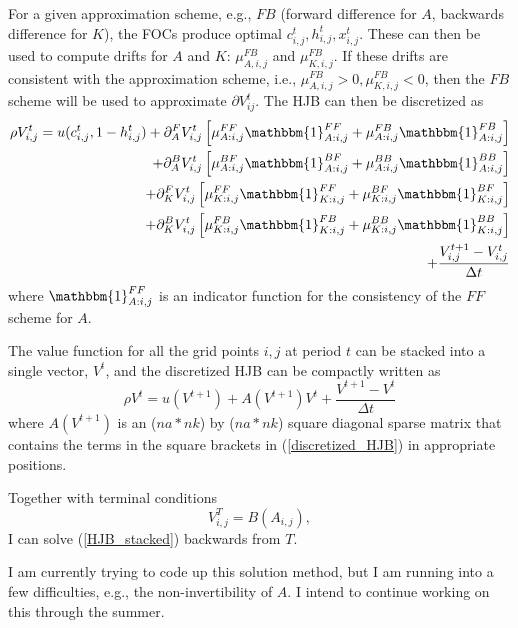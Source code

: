 \documentclass[12pt]{article}
\begin{document}
For a given approximation scheme, e.g., $FB$ (forward difference for $A$, backwards difference for $K$), the FOCs produce optimal $c_{i,j}^t, h_{i,j}^t, x_{i,j}^t$.
These can then be used to compute drifts for $A$ and $K$: $\mu_{A, i,j}^{FB}$ and $\mu_{K, i,j}^{FB}$.
If these drifts are consistent with the approximation scheme, i.e., $\mu_{A, i,j}^{FB} > 0, \mu_{K, i,j}^{FB} < 0$, then the $FB$ scheme will be used to approximate $\partial V_{ij}^t$.
The HJB can then be discretized as
\begin{align}
    \rho V_{i,j}^t = u(c_{i,j}^t, 1-h_{i,j}^t) + \partial_A^F V_{i,j}^t \left[ \mu_{A: i, j}^{FF} \mathbbm{1}_{A: i, j}^{FF} + \mu_{A: i, j}^{FB} \mathbbm{1}_{A: i, j}^{FB} \right] \label{discretized_HJB} \\
    + \partial_A^B V_{i,j}^t \left[ \mu_{A: i, j}^{BF} \mathbbm{1}_{A: i, j}^{BF} + \mu_{A: i, j}^{BB} \mathbbm{1}_{A: i, j}^{BB} \right] \nonumber \\
    + \partial_K^F V_{i,j}^t \left[ \mu_{K: i, j}^{FF} \mathbbm{1}_{K: i, j}^{FF} + \mu_{K: i, j}^{BF} \mathbbm{1}_{K: i, j}^{BF} \right] \nonumber\\
    + \partial_K^B V_{i,j}^t \left[ \mu_{K: i, j}^{FB} \mathbbm{1}_{K: i, j}^{FB} + \mu_{K: i, j}^{BB} \mathbbm{1}_{K: i, j}^{BB} \right] \nonumber \\
    + \frac{V_{i,j}^{t+1} - V_{i,j}^{t}}{\Delta t} \nonumber
\end{align}
where $\mathbbm{1}_{A:i,j}^{FF}$ is an indicator function for the consistency of the $FF$ scheme for $A$.

The value function for all the grid points $i, j$ at period $t$ can be stacked into a single vector, $V^t$, and the discretized HJB can be compactly written as
\begin{equation}
    \rho V^t = u(V^{t+1}) + A(V^{t+1}) V^t + \frac{V^{t+1} - V^t}{\Delta t} \label{HJB_stacked}
\end{equation}
where $A(V^{t+1})$ is an ($na*nk$) by ($na*nk$) square diagonal sparse matrix that contains the terms in the square brackets in (\ref{discretized_HJB}) in appropriate positions.

Together with terminal conditions
\begin{equation}
    V^T_{i,j} = B(A_{i,j}),
\end{equation}
I can solve (\ref{HJB_stacked}) backwards from $T$.

I am currently trying to code up this solution method, but I am running into a few difficulties, e.g., the non-invertibility of $A$. I intend to continue working on this through the summer.

\printbibliography
\end{document}
